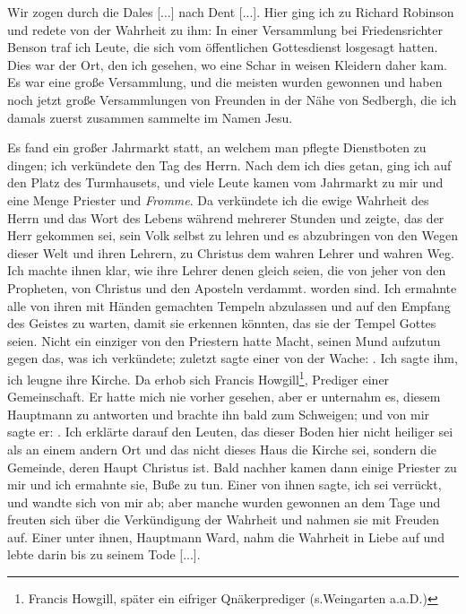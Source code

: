 Wir zogen durch die Dales [...] nach Dent [...]. Hier ging
ich zu Richard Robinson und redete von der Wahrheit zu ihm:
In einer Versammlung bei Friedensrichter 
Benson traf ich Leute,
die sich vom öffentlichen 
Gottesdienst losgesagt hatten. Dies
war der Ort, den ich gesehen, wo eine Schar in weisen Kleidern
daher kam. Es war eine große Versammlung, und die meisten
wurden gewonnen und haben noch jetzt große Versammlungen von
Freunden in der Nähe von Sedbergh, die ich damals zuerst 
zusammen sammelte im Namen Jesu.


Es fand ein großer Jahrmarkt statt, an welchem man pflegte
Dienstboten zu dingen; ich verkündete den Tag 
des Herrn. Nach 
dem ich dies getan, ging ich auf den Platz des Turmhausets, und
viele Leute kamen vom Jahrmarkt zu mir und eine Menge Priester
und \textit{Fromme}. Da verkündete ich die 
ewige Wahrheit des
Herrn und das Wort des Lebens während 
mehrerer Stunden
und zeigte, das der Herr gekommen sei, sein Volk selbst zu lehren
und es abzubringen von den Wegen dieser Welt und ihren Lehrern,
zu Christus dem wahren Lehrer und wahren Weg. Ich machte
ihnen klar, wie ihre Lehrer denen gleich seien, die von jeher
von den Propheten, von Christus und den Aposteln verdammt.
worden sind. Ich ermahnte alle von ihren mit Händen gemachten
Tempeln abzulassen und auf den Empfang des Geistes zu warten,
damit sie erkennen könnten, das sie der Tempel Gottes seien.
Nicht ein einziger von den Priestern hatte Macht, seinen Mund
aufzutun gegen das, was ich verkündete; zuletzt sagte einer von
der Wache: . Ich sagte ihm, ich leugne
ihre Kirche. Da erhob sich Francis 
Howgill\footnote{Francis Howgill, 
später ein eifriger Qnäkerprediger (s.Weingarten a.a.D.)}, 
Prediger einer
Gemeinschaft. Er hatte mich nie vorher gesehen, aber er unternahm
es, diesem Hauptmann zu antworten und brachte ihn bald zum
Schweigen; und von mir sagte er: . Ich erklärte 
darauf den Leuten, das dieser Boden hier nicht heiliger sei als an
einem andern Ort und das nicht dieses Haus die Kirche sei,
sondern die Gemeinde, deren Haupt Christus ist. Bald nachher
kamen dann einige Priester zu mir und ich ermahnte sie, Buße zu
tun. Einer von ihnen sagte, ich sei 
verrückt, und wandte sich von
mir ab; aber manche wurden gewonnen an dem Tage und freuten
sich über die Verkündigung der Wahrheit und nahmen sie mit
Freuden auf. Einer unter ihnen, Hauptmann Ward, nahm die
Wahrheit in Liebe auf und lebte darin bis zu seinem Tode [...].

